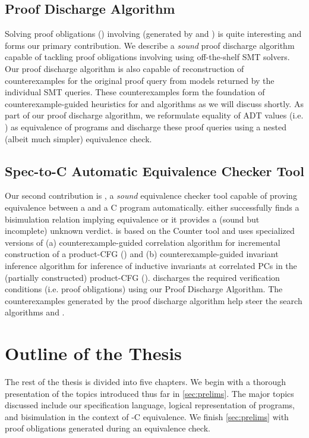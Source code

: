\subsection*{Proof Discharge Algorithm}
Solving proof obligations () involving \recursiveRelations{}
(generated by  and ) is quite interesting and forms our primary contribution.
We describe a {\em sound} proof discharge algorithm capable of tackling proof obligations involving
\recursiveRelations{} using off-the-shelf SMT solvers. Our proof discharge algorithm is also capable of
reconstruction of counterexamples for the original proof query from models returned by the individual SMT queries.
These counterexamples form the foundation of counterexample-guided heuristics for  and  algorithms
as we will discuss shortly.
As part of our proof discharge algorithm,
we reformulate equality of ADT values (i.e. \recursiveRelations{}) as equivalence of programs
and discharge these proof queries using a nested (albeit much simpler) equivalence check.

\subsection*{Spec-to-C Automatic Equivalence Checker Tool}
Our second contribution is \toolName{}, a {\em sound} equivalence checker tool
capable of proving equivalence between a \SpecL{} and a C program automatically.
\toolName{} either successfully finds a bisimulation relation implying equivalence or it provides a (sound but incomplete) unknown verdict.
\toolName{} is based on the Counter tool\cite{oopsla20} and uses specialized versions of (a) counterexample-guided correlation algorithm for
incremental construction of a product-CFG () and (b) counterexample-guided invariant inference algorithm
for inference of inductive invariants at correlated PCs in the (partially constructed) product-CFG ().
\toolName{} discharges the required verification conditions (i.e. proof obligations) using our Proof Discharge Algorithm.
The counterexamples generated by the proof discharge algorithm help steer the search algorithms  and .

\section{Outline of the Thesis}
\label{sec:outline}
The rest of the thesis is divided into five chapters.
We begin with a thorough presentation of the topics introduced thus far in \cref{sec:prelims}.
The major topics discussed include our specification language, logical representation of programs, and bisimulation
in the context of \SpecL{}-C equivalence.
We finish \cref{sec:prelims} with proof obligations generated during an equivalence check.

